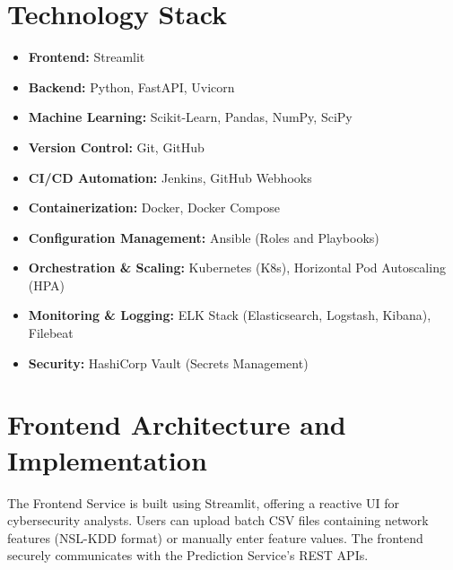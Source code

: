 \documentclass[12pt]{article}
\begin{document}
\section{Technology Stack}
\begin{itemize}
    \item \textbf{Frontend:} Streamlit
    \item \textbf{Backend:} Python, FastAPI, Uvicorn
    \item \textbf{Machine Learning:} Scikit-Learn, Pandas, NumPy, SciPy
    \item \textbf{Version Control:} Git, GitHub
    \item \textbf{CI/CD Automation:} Jenkins, GitHub Webhooks
    \item \textbf{Containerization:} Docker, Docker Compose
    \item \textbf{Configuration Management:} Ansible (Roles and Playbooks)
    \item \textbf{Orchestration \& Scaling:} Kubernetes (K8s), Horizontal Pod Autoscaling (HPA)
    \item \textbf{Monitoring \& Logging:} ELK Stack (Elasticsearch, Logstash, Kibana), Filebeat
    \item \textbf{Security:} HashiCorp Vault (Secrets Management)
\end{itemize}


\section{Frontend Architecture and Implementation}
The Frontend Service is built using Streamlit, offering a reactive UI for cybersecurity analysts. 
Users can upload batch CSV files containing network features (NSL-KDD format) or manually enter feature values. The frontend securely communicates with the Prediction Service's REST APIs.

\end{document}
